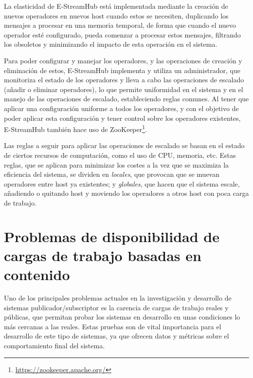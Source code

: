 La elasticidad de E-StreamHub está implementada mediante la creación de nuevos operadores
en nuevos host cuando estos se necesiten, duplicando los mensajes a procesar en una memoria temporal,
de forma que cuando el nuevo operador esté configurado, pueda comenzar a procesar estos mensajes,
filtrando los obsoletos y minimizando el impacto de esta operación en el sistema.\cite{paper:e-streamhub}

Para poder configurar y manejar los operadores, y las operaciones de creación y eliminación de estos,
E-StreamHub implementa y utiliza un administrador, que monitoriza el estado de los operadores
y lleva a cabo las operaciones de escalado (añadir o eliminar operadores), lo que permite uniformidad
en el sistema y en el manejo de las operaciones de escalado, estableciendo reglas comunes. Al tener
que aplicar una configuración uniforme a todos los operadores, y con el objetivo de poder aplicar esta
configuración y tener control sobre los operadores existentes, E-StreamHub también hace uso
de ZooKeeper\footnote{\href{https://zookeeper.apache.org/}{https://zookeeper.apache.org/}}.

Las reglas a seguir para aplicar las operaciones de escalado se basan en el estado de ciertos recursos
de computación, como el uso de CPU, memoria, etc. Estas reglas, que se aplican para minimizar los
costes a la vez que se maximiza la eficiencia del sistema, se dividen en \textit{locales}, que provocan
que se muevan operadores entre host ya existentes; y \textit{globales}, que hacen que el sistema 
escale, añadiendo o quitando host y moviendo los operadores a otros host con poca carga de trabajo.




\section{Problemas de disponibilidad de cargas de trabajo basadas en contenido} \label{sct:art_sistpubsubcont_problemasdatasetreales}

Uno de los principales problemas actuales en la investigación y desarrollo de sistemas 
publicador/subscriptor es la carencia de cargas de trabajo reales y públicas, que permitan probar los 
sistemas en desarrollo en unas condiciones lo más cercanas a las reales. Estas pruebas son de vital 
importancia para el desarrollo de este tipo de sistemas, ya que ofrecen datos y métricas sobre el
comportamiento final del sistema.

